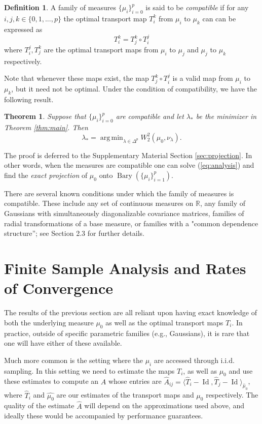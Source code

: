 \documentclass[nohyperref]{article}
\DeclareMathOperator*{\argmin}{arg\,min}
\DeclareMathOperator*{\bary}{Bary}
\DeclareMathOperator*{\id}{Id}
\newtheorem{theorem}{Theorem}
\theoremstyle{definition}
\newtheorem{definition}{Definition}
\begin{document}
\begin{definition}
    A family of measures $\{\mu_{i}\}_{i=0}^{p}$ is said to be \emph{compatible} if for any $i,j,k \in \{0,1,...,p\}$ the optimal transport map $T_i^k$ from $\mu_i$ to $\mu_k$ can can be expressed as 
    $$T_i^k = T_j^k \circ T_i^j$$
    where $T_i^j,T_j^k$ are the optimal transport maps from $\mu_i$ to $\mu_j$ and $\mu_j$ to $\mu_k$ respectively.
\end{definition}
Note that whenever these maps exist, the map $ T_j^k \circ T_i^j$ is a valid map from $\mu_i$ to $\mu_k$, but it need not be optimal.  Under the condition of compatibility, we have the following result.
\begin{theorem} \label{thm:projection}
    Suppose that $\{\mu_i\}_{i=0}^{p}$ are compatible and let $\lambda_*$ be the minimizer in Theorem \ref{thm:main}. Then
    $$\lambda_* = \argmin_{\lambda \in \Delta^p} W_2^2(\mu_0, \nu_\lambda).$$
\end{theorem}
The proof is deferred to the Supplementary Material Section \ref{sec:projection}. In other words, when the measures are compatible one can solve (\ref{eq:analysis}) and find the \emph{exact projection} of $\mu_0$ onto $\bary(\{\mu_i\}_{i=1}^p).$

There are several known conditions under which the family of measures is compatible. These include any set of continuous measures on $\mathbb{R}$, any family of Gaussians with simultaneously diagonalizable covariance matrices, families of radial transformations of a base measure, or families with a "common dependence structure''; see \cite{panaretos2020invitation} Section 2.3 for further details. 

\section{Finite Sample Analysis and Rates of Convergence} \label{sec:SampleSetting}

The results of the previous section are all reliant upon having exact knowledge of both the underlying measure $\mu_0$ as well as the optimal transport maps $T_i$. In practice, outside of specific parametric families (e.g., Gaussians), it is rare that one will have either of these available. 

Much more common is the setting where the $\mu_i$ are accessed through i.i.d. sampling. In this setting we need to estimate the maps $T_i$, as well as $\mu_0$ and use these estimates to compute an $\hat{A}$ whose entries are $\hat{A}_{ij} = \langle \hat{T}_i - \id, \hat{T}_j - \id \rangle_{\hat{\mu}_0}$,
where $\hat{T}_i$ and $\hat{\mu_0}$ are our estimates of the transport maps and $\mu_0$ respectively. The quality of the estimate $\hat{A}$ will depend on the approximations used above, and ideally these would be accompanied by performance guarantees.  
\end{document}
